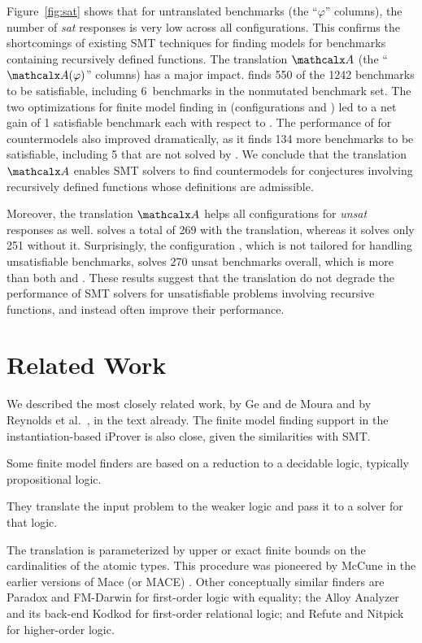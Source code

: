 Figure~\ref{fig:sat} shows that for untranslated benchmarks (the ``$\varphi$''
columns), the number of \emph{sat} responses is very low across all
configurations. This confirms the shortcomings of existing SMT techniques for
finding models for benchmarks containing recursively defined functions.
%
The translation $\conv$ (the ``$\conv(\varphi)$'' columns) has a major
impact. \cvcf finds 550 of the 1242 benchmarks to be satisfiable,
including 6~benchmarks in the nonmutated \leon benchmark set. 
The two optimizations for finite model finding in \cvc (configurations \cvcfe and \cvcfm) 
led to a net gain of 1 satisfiable benchmark each with respect to \cvcf.
The performance of \ziiib for countermodels also improved dramatically, as it
finds 134 more benchmarks to be satisfiable, including 5 that are not solved by \cvcf.
%
We conclude that the translation $\conv$ enables SMT
solvers to find countermodels for conjectures involving recursively defined
functions whose definitions are admissible.

Moreover,
the translation $\conv$ helps all configurations for \emph{unsat} responses as well.
\ziii solves a total of 269 with the translation, whereas it solves only 251 without it.
Surprisingly,
the configuration \cvcf, which is not tailored for handling unsatisfiable benchmarks,
solves 270 unsat benchmarks overall, which is more than both \cvcd and \ziii.
These results suggest that the translation do not degrade the performance 
of SMT solvers for unsatisfiable problems involving recursive functions, 
and instead often improve their performance.

\section{Related Work}
\label{sec:related-work}

We described the most closely related work, by Ge and de Moura
\cite{GeDeM-CAV-09} and by Reynolds et al.\
\cite{ReyEtAl-1-RR-13,reynolds-et-al-2013}, in the text already.
The finite model finding support in the instantiation-based iProver
\cite{korovin-2013} is also close, given the similarities with SMT.


Some finite model finders are based on a reduction to a decidable logic,
typically propositional logic. \begin{rep}They translate the input problem to the weaker
logic and pass it to a solver for that logic.\end{rep}
The translation is parameterized by upper or exact finite bounds on
the cardinalities of the atomic types. This procedure was pioneered by McCune
in the earlier versions of Mace (or MACE) \cite{mccune-1994}.
Other conceptually similar finders are Paradox \cite{claessen-sorensson-2003}
and FM-Darwin \cite{baumgartner-et-al-2009} for first-order logic with
equality; the Alloy Analyzer and its back-end Kodkod \cite{torlak-jackson-2007}
for first-order relational logic; and Refute \cite{weber-2008} and Nitpick
\cite{blanchette-nipkow-2010} for higher-order logic.

